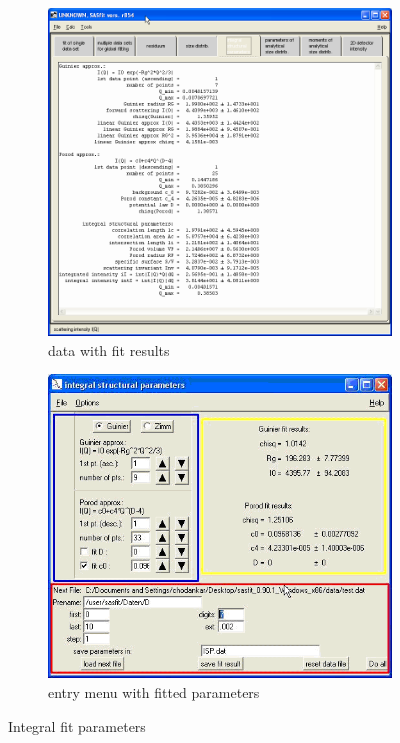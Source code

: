 \begin{figure}[htb]
\centering
\begin{subfigure}[b]{.48\textwidth}
   \centering
   \includegraphics[width=\textwidth]{QTintegralparameterTab.png}
   \caption{data with fit results}
   \label{fig:QTintegralparameterTab}
\end{subfigure}
\hfill
\begin{subfigure}[b]{.48\textwidth}
   \centering
   \includegraphics[width=\textwidth]{QTintegralparameterMenu.png}
   \caption{entry menu with fitted parameters}
   \label{fig:QTintegralparameterMenu}
\end{subfigure}
\caption{Integral fit parameters}
\label{fig:QTintegralparameter}
\end{figure}

